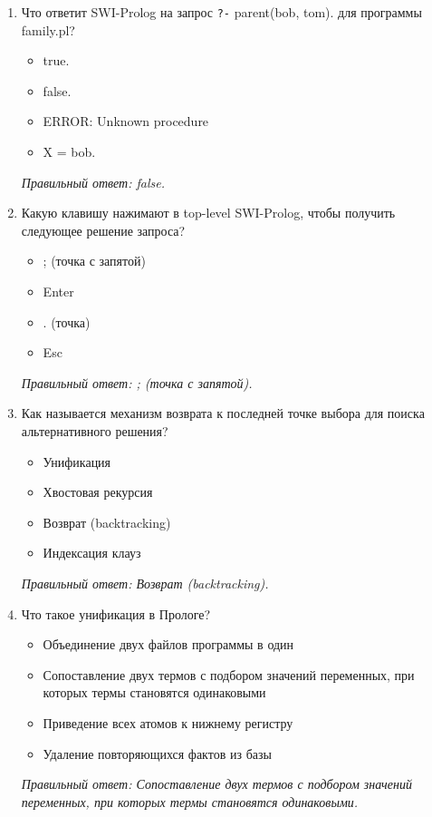 \begin{enumerate}[label=\textbf{\arabic*.}, leftmargin=0pt, itemsep=1.2em]
\item Что ответит SWI-Prolog на запрос \texttt{?-} parent(bob, tom). для программы family.pl?
\begin{itemize}[label=$\square$, leftmargin=1.5cm, itemsep=0.2em, topsep=0.3em]
\item true.
\item false.
\item ERROR: Unknown procedure
\item X = bob.
\end{itemize}
{\small\textit{Правильный ответ: false.}}

\item Какую клавишу нажимают в top-level SWI-Prolog, чтобы получить следующее решение запроса?
\begin{itemize}[label=$\square$, leftmargin=1.5cm, itemsep=0.2em, topsep=0.3em]
\item ; (точка с запятой)
\item Enter
\item . (точка)
\item Esc
\end{itemize}
{\small\textit{Правильный ответ: ; (точка с запятой).}}

\item Как называется механизм возврата к последней точке выбора для поиска альтернативного решения?
\begin{itemize}[label=$\square$, leftmargin=1.5cm, itemsep=0.2em, topsep=0.3em]
\item Унификация
\item Хвостовая рекурсия
\item Возврат (backtracking)
\item Индексация клауз
\end{itemize}
{\small\textit{Правильный ответ: Возврат (backtracking).}}

\item Что такое унификация в Прологе?
\begin{itemize}[label=$\square$, leftmargin=1.5cm, itemsep=0.2em, topsep=0.3em]
\item Объединение двух файлов программы в один
\item Сопоставление двух термов с подбором значений переменных, при которых термы становятся одинаковыми
\item Приведение всех атомов к нижнему регистру
\item Удаление повторяющихся фактов из базы
\end{itemize}
{\small\textit{Правильный ответ: Сопоставление двух термов с подбором значений переменных, при которых термы становятся одинаковыми.}}


\end{enumerate}
